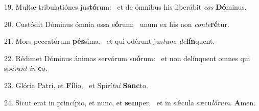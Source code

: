 19. Multæ tribulatiónes jus\textbf{tó}rum: \ast\  et de ómnibus his liberábit \textit{e}\textit{os} \textbf{Dó}minus.\

20. Custódit Dóminus ómnia ossa e\textbf{ó}rum: \ast\  unum ex his non \textit{con}\textit{te}\textbf{ré}tur.\

21. Mors peccatórum \textbf{pés}sima: \ast\  et qui odérunt jus\textit{tum}, \textit{de}\textbf{lín}quent.\

22. Rédimet Dóminus ánimas servórum su\textbf{ó}rum: \ast\  et non delínquent omnes qui spe\textit{rant} \textit{in} \textbf{e}o.\

23. Glória Patri, et \textbf{Fí}lio, \ast\  et Spirí\textit{tu}\textit{i} \textbf{Sanc}to.\

24. Sicut erat in princípio, et nunc, et \textbf{sem}per, \ast\  et in sǽcula sæcu\textit{ló}\textit{rum}. \textbf{A}men.\

